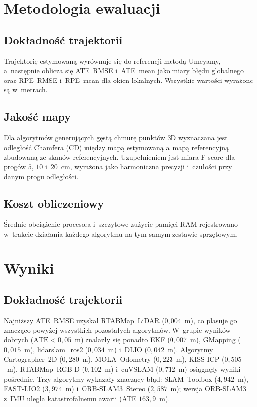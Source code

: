 \section{Metodologia ewaluacji}

\subsection{Dokładność trajektorii}

Trajektorię estymowaną wyrównuje się do referencji metodą Umeyamy,
a~następnie oblicza się ATE~RMSE i~ATE~mean jako miary błędu globalnego
oraz RPE~RMSE i~RPE~mean dla okien lokalnych.
Wszystkie wartości wyrażone są w~metrach.

\subsection{Jakość mapy}

Dla algorytmów generujących gęstą chmurę punktów 3D wyznaczana jest
odległość Chamfera (CD) między mapą estymowaną a~mapą referencyjną
zbudowaną ze skanów referencyjnych.
Uzupełnieniem jest miara F-score dla progów $5$, $10$ i~$20$~cm,
wyrażona jako harmoniczna precyzji i~czułości przy danym progu odległości.

\subsection{Koszt obliczeniowy}

Średnie obciążenie procesora i~szczytowe zużycie pamięci RAM rejestrowano
w~trakcie działania każdego algorytmu na tym samym zestawie sprzętowym.

\section{Wyniki}



\subsection{Dokładność trajektorii}



Najniższy ATE~RMSE uzyskał RTABMap~LiDAR ($0{,}004$~m), co plasuje go znacząco
powyżej wszystkich pozostałych algorytmów.
W~grupie wyników dobrych ($\text{ATE} < 0{,}05$~m) znalazły się ponadto EKF
($0{,}007$~m), GMapping ($0{,}015$~m), lidarslam\_ros2 ($0{,}034$~m)
i~DLIO ($0{,}042$~m).
Algorytmy Cartographer~2D ($0{,}280$~m), MOLA~Odometry ($0{,}223$~m),
KISS-ICP ($0{,}505$~m), RTABMap~RGB-D ($0{,}102$~m) i~cuVSLAM ($0{,}712$~m)
osiągnęły wyniki pośrednie.
Trzy algorytmy wykazały znaczący błąd: SLAM~Toolbox ($4{,}942$~m),
FAST-LIO2 ($3{,}974$~m) i~ORB-SLAM3~Stereo ($2{,}587$~m);
wersja ORB-SLAM3 z~IMU uległa katastrofalnemu awarii (ATE $163{,}9$~m).

